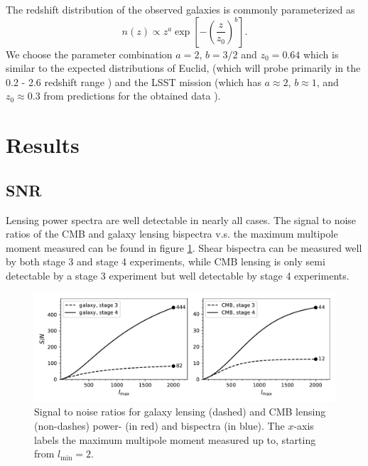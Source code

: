 \documentclass[11pt]{article} %
\newcommand{\br}[1]{\ensuremath{\left( #1 \right)}}
\newcommand{\sbr}[1]{\ensuremath{\left[ #1 \right]}}
\begin{document}
The redshift distribution of the observed galaxies is commonly parameterized as \cite{bartelmann2001weak}
\begin{equation*}
    n(z) \propto z^a \exp\sbr{-\br{\frac{z}{z_0}}^b}.
\end{equation*}
We choose the parameter combination $a = 2$, $b = 3/2$ and $z_0 = 0.64$ which is similar to the expected distributions of Euclid, (which will probe primarily in the 0.2 - 2.6 redshift range \cite{euclidprep10})
and the LSST mission (which has $a \approx 2$, $b \approx 1$, and $z_0 \approx 0.3$ from predictions for the obtained data \cite{lsstsciencebookchapter3}).

\section{Results}\label{sec:results}
\subsection{SNR}
Lensing power spectra are well detectable in nearly all cases. 
The signal to noise ratios of the CMB and galaxy lensing bispectra v.s. the maximum multipole moment measured can be found in figure \ref{fig:snrplots}. Shear bispectra can be measured well by both stage 3 and stage 4 experiments, while CMB lensing is only semi detectable by a stage 3 experiment but well detectable by stage 4 experiments.
\begin{figure}
    \includegraphics[width=\textwidth]{figures/snrplots.pdf}
    \caption{Signal to noise ratios for galaxy lensing (dashed) and CMB lensing (non-dashes) power- (in red) and bispectra (in blue). The $x$-axis labels the maximum multipole moment measured up to, starting from $l_{\min}=2$.}
    \label{fig:snrplots}
\end{figure}
\end{document}

